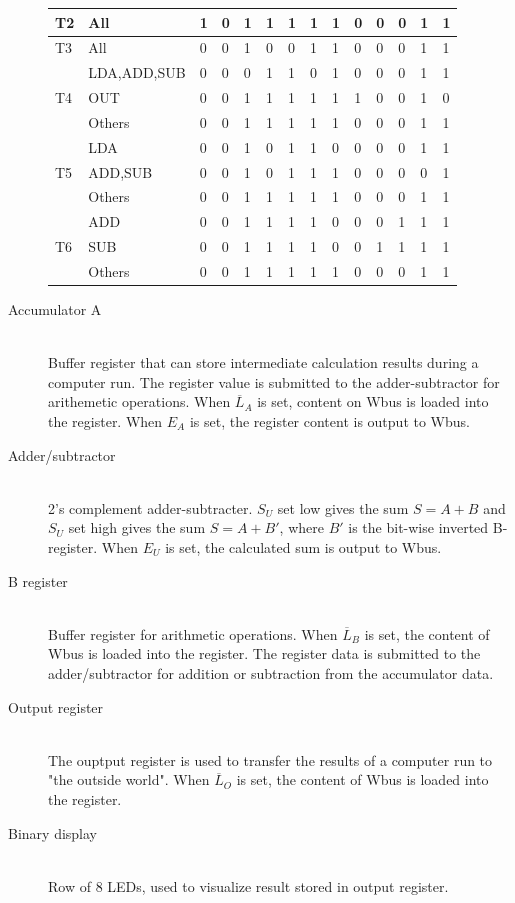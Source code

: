 \begin{description}
\begin{table}[hbpt]
\begin{tabular}{p{0.8cm}lp{0.3cm}p{0.3cm}p{0.3cm}p{0.3cm}p{0.3cm}p{0.3cm}p{0.3cm}p{0.3cm}p{0.3cm}p{0.3cm}p{0.3cm}p{0.3cm}}
    \hline
    T2 &All&	        1&	0&	1&	1&	1&	1&	1&	0&	0&	0&	1&	1\\
    \hline
    T3 &All&	        0&	0&	1&	0&	0&	1&	1&	0&	0&	0&	1&	1\\
    \hline
    \multirow{3}{*}{T4}& LDA,ADD,SUB &  0&	0&	0&	1&	1&	0&	1&	0&	0&	0&	1&	1\\
    \cline{2-14}
    & OUT&	        0&	0&	1&	1&	1&	1&	1&	1&	0&	0&	1&	0\\
    \cline{2-14}
    & Others&	    0&	0&	1&	1&	1&	1&	1&	0&	0&	0&	1&	1\\
    \hline
    \multirow{3}{*}{T5} &LDA&	        0&	0&	1&	0&	1&	1&	0&	0&	0&	0&	1&	1\\
    \cline{2-14}
    &ADD,SUB&	    0&	0&	1&	0&	1&	1&	1&	0&	0&	0&	0&	1\\
    \cline{2-14}
    &Others&	    0&	0&	1&	1&	1&	1&	1&	0&	0&	0&	1&	1\\
    \hline
    \multirow{3}{*}{T6} &ADD&	        0&	0&	1&	1&	1&	1&	0&	0&	0&	1&	1&	1\\
    \cline{2-14}
    &SUB&	        0&	0&	1&	1&	1&	1&	0&	0&	1&	1&	1&	1\\
    \cline{2-14}
    &Others&	    0&	0&	1&	1&	1&	1&	1&	0&	0&	0&	1&	1\\
    \hline
    \end{tabular}
\end{table}
    \item[Accumulator A] \hfill \\
    Buffer register that can store intermediate calculation results during a computer run. The register value is submitted to the adder-subtractor for arithemetic operations. When $\overline{L}_A$ is set, content on Wbus is loaded into the register. When $E_A$ is set, the register content is output to Wbus. 
    \item[Adder/subtractor] \hfill \\
    2's complement adder-subtracter. $S_U$ set low gives the sum $S=A+B$ and $S_U$ set high gives the sum $S=A+B'$, where $B'$ is the bit-wise inverted B-register. When $E_U$ is set, the calculated sum is output to Wbus.
    \item[B register] \hfill \\
    Buffer register for arithmetic operations. When $\overline{L}_B$ is set, the content of Wbus is loaded into the register. The register data is submitted to the adder/subtractor for addition or subtraction from the accumulator data.
    \item[Output register] \hfill \\
    The ouptput register is used to transfer the results of a computer run to "the outside world". When $\overline{L}_O$ is set, the content of Wbus is loaded into the register. 
    \item[Binary display] \hfill \\
    Row of 8 LEDs, used to visualize result stored in output register.
\end{description}
